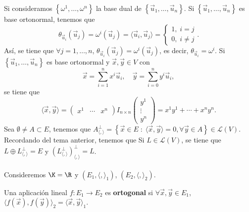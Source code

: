 Si consideramos $\displaystyle \left\{ \omega^{1}, \ldots, \omega^{n}\right\}  $ la base dual de $\displaystyle \left\{ \vec{u}_{1}, \ldots, \vec{u}_{n}\right\}  $. Si $\displaystyle \left\{ \vec{u}_{1}, \ldots, \vec{u}_{n}\right\}  $ es base ortonormal, tenemos que 
\[\theta_{\vec{u}_{i}}\left(\vec{u}_{j}\right) = \omega^{i}\left(\vec{u}_{j}\right) = \langle \vec{u}_{i}, \vec{u}_{j}\rangle =
\begin{cases}
1, \; i = j \\
0, \; i \neq j
\end{cases}
.\]
Así, se tiene que $\displaystyle \forall j = 1, \ldots, n $, $\displaystyle \theta_{\vec{u}_{i}} \left(\vec{u}_{j}\right) = \omega^{i}\left(\vec{u}_{j}\right) $, es decir, $\displaystyle \theta_{\vec{u}_{i}} = \omega^{i} $.
Si $\displaystyle \left\{ \vec{u}_{1}, \ldots, \vec{u}_{n}\right\}  $ es base ortonormal y $\displaystyle \vec{x}, \vec{y} \in V $ con 
\[ \vec{ x} = \sum^{n}_{i = 1}x^{i}\vec{u}_{i}, \quad \vec{y} = \sum^{n}_{ i= 0}y^{i}\vec{u}_{i} ,\]
se tiene que 
\[\langle \vec{x}, \vec{y} \rangle = \begin{pmatrix} x^{1} & \cdots & x^{n} \end{pmatrix} I_{n\times n}\begin{pmatrix} y^{1} \\ \vdots \\ y^{n} \end{pmatrix} = x^{1}y^{1} + \cdots + x^{n}y^{n}.\]
Sea $\displaystyle \emptyset \neq A \subset E $, tenemos que $\displaystyle A^{\perp }_{\langle, \rangle } = \left\{ \vec{x} \in E \; : \; \langle \vec{x}, \vec{y} \rangle = 0, \forall\vec{y} \in A\right\} \in \mathcal{L}\left(V\right) $. Recordando del tema anterior, tenemos que Si $\displaystyle L \in \mathcal{L}\left(V\right) $, se tiene que $\displaystyle L \oplus L^{\perp }_{\langle, \rangle} = E $ y $\displaystyle \left(L^{\perp }_{\langle, \rangle }\right)^{\perp }_{\langle, \rangle} = L $. \\ \\
Consideremos $\displaystyle \K = \R $ y $\displaystyle \left(E_{1}, \langle, \rangle_{1}\right) $, $\displaystyle \left(E_{2}, \langle, \rangle_{2}\right) $.
\begin{fdefinition}[Ortogonal]
\normalfont Una aplicación lineal $\displaystyle f : E_{1} \to E_{2}$ es \textbf{ortogonal} si $\displaystyle \forall \vec{x}, \vec{y} \in E_{1} $, $\displaystyle \langle f\left(\vec{x}\right), f\left(\vec{y}\right)\rangle_{2} = \langle \vec{x}, \vec{y}\rangle_{1} $.
\end{fdefinition}
